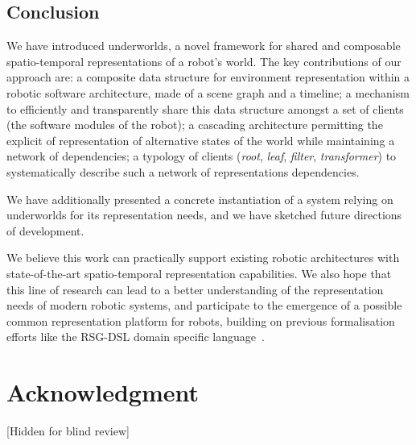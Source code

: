 \documentclass[conference]{IEEEtran}
\newcommand{\uwds}{{\sc underworlds}\xspace}
\begin{document}
\subsection{Conclusion}

We have introduced \uwds, a novel framework for shared and composable
spatio-temporal representations of a robot's world. The key contributions of our
approach are: a composite data structure for environment representation within a
robotic software architecture, made of a scene graph and a timeline; a mechanism
to efficiently and transparently share this data structure amongst a set of
clients (the software modules of the robot); a cascading architecture permitting
the explicit of representation of alternative states of the world while
maintaining a network of dependencies; a typology of clients
(\emph{root}, \emph{leaf}, \emph{filter}, \emph{transformer}) to systematically
describe such a network of representations dependencies.

We have additionally presented a concrete instantiation of a system relying on \uwds
for its representation needs, and we have sketched future directions of
development.

We believe this work can practically support existing robotic architectures with
state-of-the-art spatio-temporal representation capabilities. We also hope that
this line of research can lead to a better understanding of the representation
needs of modern robotic systems, and participate to the emergence of a possible
common representation platform for robots, building on previous formalisation
efforts like the RSG-DSL domain specific language~\cite{blumenthal2014towards}.

\section*{Acknowledgment}



[Hidden for blind review]



\end{document}
